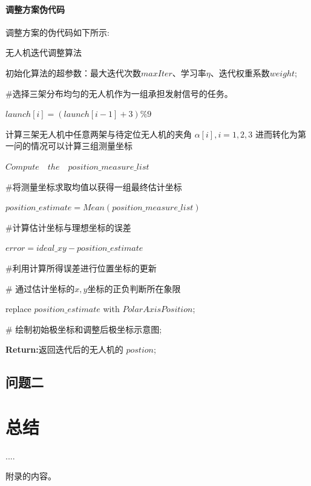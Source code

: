 \documentclass[withoutpreface,bwprint]{cumcmthesis} %
\begin{document}
			\paragraph{调整方案伪代码}
			调整方案的伪代码如下所示:
			\par
			\begin{algorithm}[H]
				\caption{无人机迭代调整算法}
				初始化算法的超参数：最大迭代次数$ maxIter $、学习率$ \eta $、迭代权重系数$ weight $;
				\par {}
				{
					\#选择三架分布均匀的无人机作为一组承担发射信号的任务。
					\par  $ launch[i] =(launch[i-1] + 3) \% 9 $
					\par {}
					{
						计算三架无人机中任意两架与待定位无人机的夹角 $\alpha[i],i=1,2,3 $ \;
						进而转化为第一问的情况可以计算三组测量坐标
						\par $ Compute\quad the\quad position\_measure\_list $
						\par \#将测量坐标求取均值以获得一组最终估计坐标
						\par  $ position\_estimate= Mean(position\_measure\_list) $
						\par \#计算估计坐标与理想坐标的误差
						\par$  error = ideal\_xy -position\_estimate $
						\par \#利用计算所得误差进行位置坐标的更新
						\par {}
						{
							\# 通过估计坐标的$ x,y $坐标的正负判断所在象限
							\par replace $position\_estimate$ with $ PolarAxisPosition $;
						}
					}
					\# 绘制初始极坐标和调整后极坐标示意图;		
				}
				\textbf{Return:}返回迭代后的无人机的 $postion$;
				\label{code}
			\end{algorithm}
		\subsection{问题二}
	\section{总结}
	
	\begin{thebibliography}{9}%
		 ....
	\end{thebibliography}
	\begin{appendices}
		附录的内容。
	\end{appendices}
\end{document}

